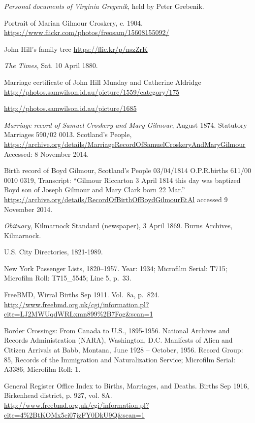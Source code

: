 \begin{thebibliography}{99}
	\emph{Personal documents of Virginia Gregenik}, held by Peter Grebenik.

	Portrait of Marian Gilmour Croskery, c. 1904.
	\url{https://www.flickr.com/photos/freosam/15608155092/}

	John Hill's family tree \url{https://flic.kr/p/nszZrK}

	\emph{The Times}, Sat. 10 April 1880.

	Marriage certificate of John Hill Munday and Catherine Aldridge
	\url{http://photos.samwilson.id.au/picture/1559/category/175}

	\url{http://photos.samwilson.id.au/picture/1685}

	\emph{Marriage record of Samuel Croskery and Mary Gilmour}, August 1874.
	Statutory Marriages 590/02 0013. Scotland's People,
	\url{https://archive.org/details/MarriageRecordOfSamuelCroskeryAndMaryGilmour}
	Accessed: 8 November 2014.

	Birth record of Boyd Gilmour,
	Scotland's People 03/04/1814 O.P.R.births 611/00 0010 0319,
	Transcript: ``Gilmour Riccarton 3 April 1814 this day was baptized Boyd son of Joseph Gilmour and Mary Clark born 22 Mar.''
	\url{https://archive.org/details/RecordOfBirthOfBoydGilmourEtAl} accessed 9 November 2014.

	\emph{Obituary}, Kilmarnock Standard (newspaper), 3 April 1869. Burns Archives, Kilmarnock.

	U.S. City Directories, 1821-1989.

	New York Passenger Lists, 1820--1957. Year: 1934; Microfilm Serial: T715; Microfilm Roll: T715\_5545; Line 5, p.\ 33.

	FreeBMD, Wirral Births Sep 1911. Vol.\ 8a, p.\ 824.
	\url{http://www.freebmd.org.uk/cgi/information.pl?cite=LJ2MWUqdWRLxmn899\%2B7Fog&scan=1}

	Border Crossings: From Canada to U.S., 1895-1956.
	National Archives and Records Administration (NARA), Washington, D.C.
	Manifests of Alien and Citizen Arrivals at Babb, Montana, June 1928 -- October, 1956.
	Record Group: 85, Records of the Immigration and Naturalization Service; Microfilm Serial: A3386; Microfilm Roll: 1.

	General Register Office Index to Births, Marriages, and Deaths.
	Births Sep 1916, Birkenhead district, p. 927, vol. 8A.
	\url{http://www.freebmd.org.uk/cgi/information.pl?cite=4\%2BtKOMx5ci07jzFY0DkU9Q&scan=1}


\end{thebibliography}

